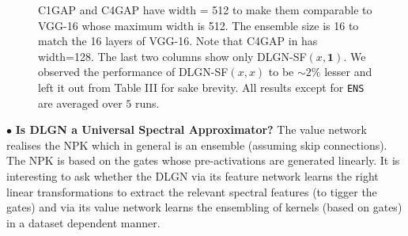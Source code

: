 \begin{figure}
\centering
\resizebox{0.9\columnwidth}{!}{

}
\caption{\small{C1GAP and C4GAP have width = 512 to make them comparable to VGG-16 whose maximum width is 512. The ensemble size is 16 to match the 16 layers of VGG-16. Note that C4GAP in  has width=128. The last two columns show only DLGN-SF$(x,\mathbf{1})$. We observed the performance of DLGN-SF$(x,x)$ to be $\sim 2\%$ lesser and left it out from Table III for sake brevity. All results except for \texttt{ENS} are averaged over $5$ runs.}}
\label{fig:shallow}
\end{figure}

$\bullet$ \textbf{Is DLGN a Universal Spectral Approximator?} The value network realises the NPK which in general is an ensemble (assuming skip connections). The NPK is based on the gates whose pre-activations are generated linearly. It is interesting to ask whether the DLGN via its feature network learns the right linear transformations to extract the relevant spectral features (to tigger the gates) and via its value network learns  the ensembling of kernels (based on gates) in a dataset dependent manner.



